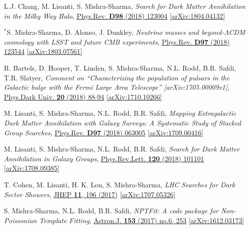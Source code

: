 \documentclass[11pt]{article}
\newenvironment{packed_enumerate}[1][]{
\begin{etaremune}[#1]
  \setlength{\itemsep}{3pt}
  \setlength{\parskip}{0pt}
  \setlength{\parsep}{0pt}}{\end{etaremune}
}
\begin{document}
\begin{packed_enumerate}[start=24]
  \item L.J. Chang, M. Lisanti, S. Mishra-Sharma, \emph{Search for Dark Matter Annihilation in the Milky Way Halo}, \href{https://journals.aps.org/prd/abstract/10.1103/PhysRevD.98.123004}{Phys.Rev. \textbf{D98} (2018) 123004} \href{https://arxiv.org/abs/1804.04132}{[arXiv:1804.04132]}

  \item $^*$S. Mishra-Sharma, D. Alonso, J. Dunkley, \emph{Neutrino masses and beyond-$\Lambda$CDM cosmology with LSST and future CMB experiments}, \href{https://journals.aps.org/prd/abstract/10.1103/PhysRevD.97.123544}{Phys.Rev. \textbf{D97} (2018) 123544}  \href{https://arxiv.org/abs/1803.07561}{[arXiv:1803.07561]}

  \item R. Bartels, D. Hooper, T. Linden, S. Mishra-Sharma, N.L. Rodd, B.R. Safdi, T.R. Slatyer, \emph{Comment on ``Characterizing the population of pulsars in the Galactic bulge with the
  {\it Fermi} Large Area Telescope'' [arXiv:1705.00009\MakeLowercase{v}1]}, \href{https://www.sciencedirect.com/science/article/pii/S2212686418300268}{Phys.Dark Univ. \textbf{20} (2018) 88-94} \href{https://arxiv.org/abs/1710.10266}{[arXiv:1710.10266]}

  \item M. Lisanti, S. Mishra-Sharma, N.L. Rodd, B.R. Safdi, \emph{Mapping Extragalactic Dark Matter Annihilation with Galaxy Surveys: A Systematic Study of Stacked Group Searches},  \href{https://journals.aps.org/prd/abstract/10.1103/PhysRevD.97.063005}{Phys.Rev. \textbf{D97} (2018) 063005} \href{https://arxiv.org/abs/1709.00416}{[arXiv:1709.00416]}

  \item M. Lisanti, S. Mishra-Sharma, N.L. Rodd, B.R. Safdi, \emph{Search for Dark Matter Annihilation in Galaxy Groups},  \href{https://journals.aps.org/prl/abstract/10.1103/PhysRevLett.120.101101}{Phys.Rev.Lett. \textbf{120} (2018) 101101} \href{https://arxiv.org/abs/1708.09385}{[arXiv:1708.09385]}

  \item T. Cohen, M. Lisanti, H. K. Lou, S. Mishra-Sharma, \emph{LHC Searches for Dark Sector Showers},  \href{https://link.springer.com/article/10.1007/JHEP11(2017)196}{JHEP \textbf{11}, 196 (2017)}  \href{https://arxiv.org/abs/1707.05326}{ [arXiv:1707.05326]}

  \item S. Mishra-Sharma, N.L. Rodd, B.R. Safdi, \emph{NPTFit: A code package for Non-Poissonian Template Fitting},  \href{http://iopscience.iop.org/article/10.3847/1538-3881/aa6d5f/meta}{Astron.J. \textbf{153} (2017) no.6, 253}  \href{https://arxiv.org/abs/1612.03173}{ [arXiv:1612.03173]}


\end{packed_enumerate}
\end{document}
